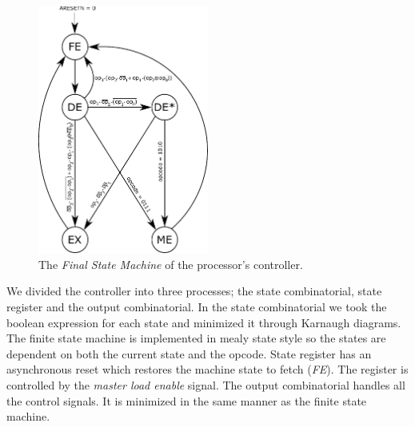 \documentclass[a4,11pt]{article}
\begin{document}
\begin{figure}[h!]
	\centering
	\includegraphics[width=0.5\textwidth]{Figurer/procController_FSM_Mealy}
	\caption{The {\it Final State Machine} of the processor's controller.}
	\label{fig:fsm}
\end{figure}


We divided the controller into three processes; the state combinatorial, state register and
the output combinatorial. In the state combinatorial we took the boolean expression for each 
state and minimized it through Karnaugh diagrams. The finite state machine is implemented in 
mealy state style so the states are dependent on both the current state and the opcode. 
State register has an asynchronous reset which restores the machine state to fetch ({\it FE}). 
The register is controlled by the \emph{master load enable} signal. The output combinatorial 
handles all the control signals. It is minimized in the same manner as the finite state machine.
\end{document}

